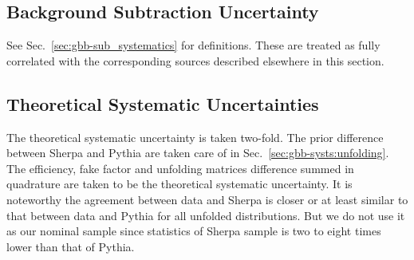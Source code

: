 \begin{enumerate}
  
\end{enumerate}

\subsection{Background Subtraction Uncertainty}
\label{sec:gbb-systs:background}

See Sec.~\ref{sec:gbb-sub_systematics} for definitions. These are treated as fully correlated with the corresponding sources described elsewhere in this section.%
  

\subsection{Theoretical Systematic Uncertainties}
\label{sec:gbb-systs:theory}

The theoretical systematic uncertainty is taken two-fold. The prior difference between Sherpa and Pythia are taken care of in Sec.~\ref{sec:gbb-systs:unfolding}. The efficiency, fake factor and unfolding matrices difference summed in quadrature are taken to be the theoretical systematic uncertainty. It is noteworthy the agreement between data and Sherpa is closer or at least similar to that between data and Pythia for all unfolded distributions. But we do not use it as our nominal sample since statistics of Sherpa sample is two to eight times lower than that of Pythia.

